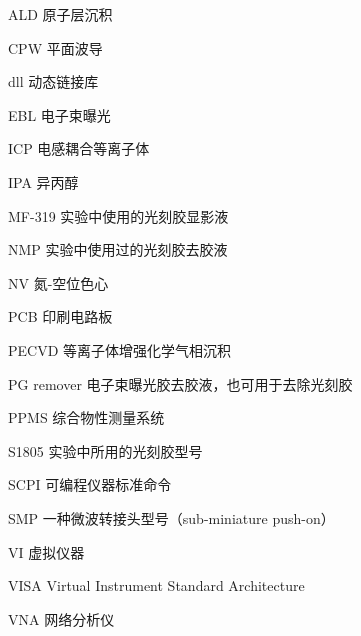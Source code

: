 

\begin{denotation}[3cm]
\item[ALD] 原子层沉积
\item[CPW] 平面波导
\item[dll] 动态链接库
\item[EBL] 电子束曝光
\item[ICP] 电感耦合等离子体
\item[IPA] 异丙醇
\item[MF-319] 实验中使用的光刻胶显影液
\item[NMP] 实验中使用过的光刻胶去胶液
\item[NV] 氮-空位色心
\item[PCB] 印刷电路板
\item[PECVD] 等离子体增强化学气相沉积
\item[PG remover] 电子束曝光胶去胶液，也可用于去除光刻胶
\item[PPMS] 综合物性测量系统
\item[S1805] 实验中所用的光刻胶型号
\item[SCPI] 可编程仪器标准命令
\item[SMP] 一种微波转接头型号（sub-miniature push-on）
\item[VI] 虚拟仪器
\item[VISA] Virtual Instrument Standard Architecture
\item[VNA] 网络分析仪
\end{denotation}
